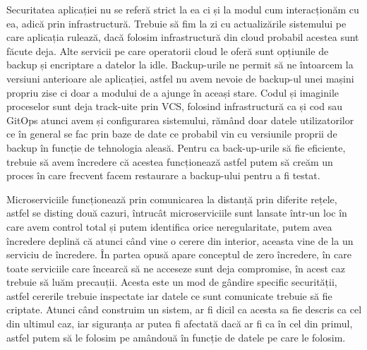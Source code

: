 Securitatea aplicației nu se referă strict la ea ci și la modul cum interacționăm cu ea,
adică prin infrastructură. Trebuie să fim la zi cu actualizările sistemului pe care
aplicația rulează, dacă folosim infrastructură din cloud probabil acestea sunt făcute deja.
Alte servicii pe care operatorii cloud le oferă sunt opțiunile de backup și encriptare a
datelor la idle. Backup-urile ne permit să ne întoarcem la versiuni anterioare ale aplicației,
astfel nu avem nevoie de backup-ul unei mașini propriu zise ci doar a modului de a ajunge în aceași stare.
Codul și imaginile proceselor sunt deja track-uite prin VCS, folosind infrastructură ca și cod sau
GitOps atunci avem și configurarea sistemului, rămând doar datele utilizatorilor ce în general
se fac prin baze de date ce probabil vin cu versiunile proprii de backup în funcție de
tehnologia aleasă. Pentru ca back-up-urile să fie eficiente, trebuie să avem încredere că acestea
funcționează astfel putem să creăm un proces în care frecvent facem restaurare a backup-ului
pentru a fi testat.

Microserviciile funcționează prin comunicarea la distanță prin diferite rețele, astfel se disting două
cazuri, întrucât microserviciile sunt lansate într-un loc în care avem control total și
putem identifica orice neregularitate, putem avea încredere deplină că atunci când vine
o cerere din interior, aceasta vine de la un serviciu de încredere. În partea opusă apare
conceptul de zero încredere, în care toate serviciile care încearcă să ne acceseze sunt deja
compromise, în acest caz trebuie să luăm precauții. Acesta este un mod de gândire specific
securității, astfel cererile trebuie inspectate iar datele ce sunt comunicate trebuie să fie criptate.
Atunci când construim un sistem, ar fi dicil ca acesta sa fie descris ca cel din ultimul caz,
iar siguranța ar putea fi afectată dacă ar fi ca în cel din primul, astfel putem să le
folosim pe amândouă în funcție de datele pe care le folosim.

